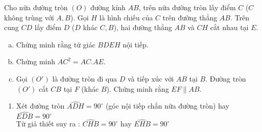 \begin{ex}%
  Cho nữa đường tròn $(O)$ đường kính $AB$, trên nữa đường tròn lấy điểm $C$ ($C$ không trùng với $A,B$). Gọi $H$ là hình chiếu của $C$ trên đường thẳng $AB$. Trên cung $CD$ lấy điểm $D$ ($D$ khác $C,B$), hai đường thẳng $AB$ và $CH$ cắt nhau tại $E$.
    \begin{enumerate}[a)]
        \item Chứng minh rằng tứ giác $BDEH$ nội tiếp.
        \item Chứng minh $AC^2=AC.AE$.
        \item Gọi $(O')$ là đường tròn đi qua $D$ và tiếp xúc với $AB$ tại $B$. Đường tròn $(O')$ cắt $CB$ tại $F$ (khác $B$). Chứng minh rằng $EF\parallel AB$.
    \end{enumerate}
\loigiai
    {
    \begin{center}
    \end{center}
    \begin{enumerate}
        \item Xét đường tròn $\widehat{ADH}=90^\circ$ (góc nội tiếp chắn nữa đường tròn) hay $\widehat{EDB}=90^\circ$\\
        Từ giả thiết suy ra : $\widehat{CHB}=90^\circ$ hay $\widehat{EHB}=90^\circ$\\

\end{enumerate}}
\end{ex}
